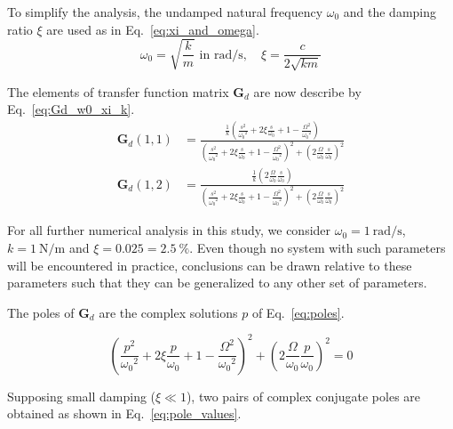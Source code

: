 \documentclass[10pt]{iopart}
\begin{document}
To simplify the analysis, the undamped natural frequency \(\omega_0\) and the damping ratio \(\xi\) are used as in Eq.~\eqref{eq:xi_and_omega}.
\begin{equation}
\label{eq:xi_and_omega}
  \omega_0 = \sqrt{\frac{k}{m}} \text{ in } \si{\radian\per\second}, \quad \xi = \frac{c}{2 \sqrt{k m}}
\end{equation}

The elements of transfer function matrix \(\mathbf{G}_d\) are now describe by Eq.~\eqref{eq:Gd_w0_xi_k}.
\begin{subequations}
\label{eq:Gd_w0_xi_k}
  \begin{align}
    \mathbf{G}_{d}(1,1) &= {\scriptstyle \frac{\frac{1}{k} \left( \frac{s^2}{{\omega_0}^2} + 2 \xi \frac{s}{\omega_0} + 1 - \frac{{\Omega}^2}{{\omega_0}^2} \right)}{\left( \frac{s^2}{{\omega_0}^2} + 2 \xi \frac{s}{\omega_0} + 1 - \frac{{\Omega}^2}{{\omega_0}^2} \right)^2 + \left( 2 \frac{\Omega}{\omega_0} \frac{s}{\omega_0} \right)^2}}  \\
    \mathbf{G}_{d}(1,2) &= {\scriptstyle \frac{\frac{1}{k} \left( 2 \frac{\Omega}{\omega_0} \frac{s}{\omega_0} \right)}{\left( \frac{s^2}{{\omega_0}^2} + 2 \xi \frac{s}{\omega_0} + 1 - \frac{{\Omega}^2}{{\omega_0}^2} \right)^2 + \left( 2 \frac{\Omega}{\omega_0} \frac{s}{\omega_0} \right)^2}}
  \end{align}
\end{subequations}

For all further numerical analysis in this study, we consider \(\omega_0 = \SI{1}{\radian\per\second}\), \(k = \SI{1}{\newton\per\meter}\) and \(\xi = 0.025 = \SI{2.5}{\percent}\).
Even though no system with such parameters will be encountered in practice, conclusions can be drawn relative to these parameters such that they can be generalized to any other set of parameters.

\par
The poles of \(\mathbf{G}_d\) are the complex solutions \(p\) of Eq.~\eqref{eq:poles}.

\begin{equation}
\label{eq:poles}
  \left( \frac{p^2}{{\omega_0}^2} + 2 \xi \frac{p}{\omega_0} + 1 - \frac{{\Omega}^2}{{\omega_0}^2} \right)^2 + \left( 2 \frac{\Omega}{\omega_0} \frac{p}{\omega_0} \right)^2 = 0
\end{equation}

Supposing small damping (\(\xi \ll 1\)), two pairs of complex conjugate poles are obtained as shown in Eq.~\eqref{eq:pole_values}.
\end{document}
